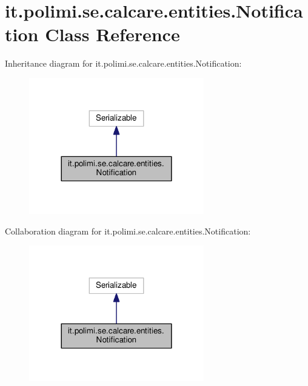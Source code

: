 \hypertarget{classit_1_1polimi_1_1se_1_1calcare_1_1entities_1_1Notification}{}\section{it.\+polimi.\+se.\+calcare.\+entities.\+Notification Class Reference}
\label{classit_1_1polimi_1_1se_1_1calcare_1_1entities_1_1Notification}


Inheritance diagram for it.\+polimi.\+se.\+calcare.\+entities.\+Notification\+:
\nopagebreak
\begin{figure}[H]
\begin{center}
\leavevmode
\includegraphics[width=216pt]{classit_1_1polimi_1_1se_1_1calcare_1_1entities_1_1Notification__inherit__graph}
\end{center}
\end{figure}


Collaboration diagram for it.\+polimi.\+se.\+calcare.\+entities.\+Notification\+:
\nopagebreak
\begin{figure}[H]
\begin{center}
\leavevmode
\includegraphics[width=216pt]{classit_1_1polimi_1_1se_1_1calcare_1_1entities_1_1Notification__coll__graph}
\end{center}
\end{figure}
